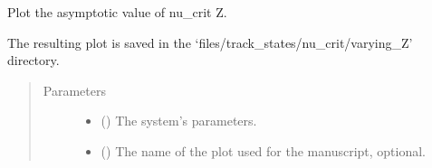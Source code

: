 \documentclass[letterpaper,10pt,english]{sphinxmanual}
\begin{document}
\begin{fulllineitems}
\label{\detokenize{modules:modules.utils.plot_micro_nu_crit_limit_vs_Z}}
\pysigstartsignatures
{}
\pysigstopsignatures
\sphinxAtStartPar
Plot the asymptotic value of nu\_crit  Z.

\sphinxAtStartPar
The resulting plot is saved in the ‘files/track\_states/nu\_crit/varying\_Z’ directory.
\begin{quote}\begin{description}
\item[{Parameters}] \leavevmode\begin{itemize}
\item {} 
\sphinxAtStartPar
{} () \textendash{} The system’s parameters.

\item {} 
\sphinxAtStartPar
{} () \textendash{} The name of the plot used for the manuscript, optional.

\end{itemize}

\end{description}\end{quote}

\end{fulllineitems}

\end{document}
